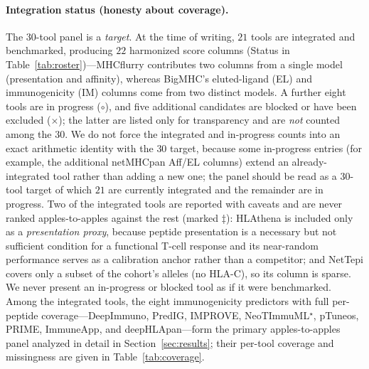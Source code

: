 \paragraph{Integration status (honesty about coverage).} The $30$-tool panel is a
\emph{target}. At the time of writing, $21$ tools are integrated and benchmarked,
producing $22$ harmonized score columns (Status \checkmark in
Table~\ref{tab:roster})---MHCflurry contributes two columns from a single model
(presentation and affinity), whereas BigMHC's eluted-ligand (EL) and
immunogenicity (IM) columns come from two distinct models. A further eight tools
are in progress ($\circ$), and five additional candidates are blocked or have been
excluded ($\times$); the latter are listed only for transparency and are
\emph{not} counted among the $30$. We do not force the integrated and in-progress
counts into an exact arithmetic identity with the $30$ target, because some
in-progress entries (for example, the additional netMHCpan Aff/EL columns) extend
an already-integrated tool rather than adding a new one; the panel should be read
as a $30$-tool target of which $21$ are currently integrated and the remainder are
in progress. Two of the integrated tools are reported with caveats and are never
ranked apples-to-apples against the rest (marked $\ddagger$): HLAthena is included
only as a \emph{presentation proxy}, because peptide presentation is a necessary
but not sufficient condition for a functional T-cell response and its near-random
performance serves as a calibration anchor rather than a competitor; and NetTepi
covers only a subset of the cohort's alleles (no HLA-C), so its column is sparse.
We never present an in-progress or blocked tool as if it were benchmarked. Among
the integrated tools, the eight immunogenicity predictors with full per-peptide
coverage---DeepImmuno, PredIG, IMPROVE, NeoTImmuML$^\star$, pTuneos, PRIME,
ImmuneApp, and deepHLApan---form the primary apples-to-apples panel analyzed in
detail in Section~\ref{sec:results}; their per-tool coverage and missingness are
given in Table~\ref{tab:coverage}.

